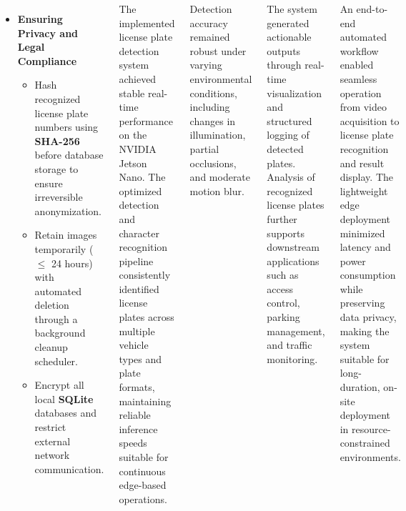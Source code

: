 \documentclass[25pt,a0paper,portrait]{tikzposter}
\begin{document}
\begin{columns}
{{\begin{itemize}
				\item \textbf{Ensuring Privacy and Legal Compliance}
				\begin{itemize}
					\item Hash recognized license plate numbers using \textbf{SHA-256} before database storage to ensure irreversible anonymization.
					\item Retain images temporarily ($\leq$ 24 hours) with automated deletion through a background cleanup scheduler.
					\item Encrypt all local \textbf{SQLite} databases and restrict external network communication.
				\end{itemize}
			\end{itemize}
			
			}
			
			{
			The implemented license plate detection system achieved stable real-time performance on the NVIDIA Jetson Nano. The optimized detection and character recognition pipeline consistently identified license plates across multiple vehicle types and plate formats, maintaining reliable inference speeds suitable for continuous edge-based operations. \newline
			
			Detection accuracy remained robust under varying environmental conditions, including changes in illumination, partial occlusions, and moderate motion blur. 
			
			The system generated actionable outputs through real-time visualization and structured logging of detected plates. Analysis of recognized license plates further supports downstream applications such as access control, parking management, and traffic monitoring. \newline
			
			An end-to-end automated workflow enabled seamless operation from video acquisition to license plate recognition and result display. The lightweight edge deployment minimized latency and power consumption while preserving data privacy, making the system suitable for long-duration, on-site deployment in resource-constrained environments.\newline \newline 
			}
		}
		
	\end{columns}
	
\end{document}

